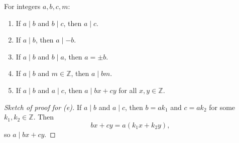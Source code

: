 \begin{proposition}
For integers $a, b, c, m$:
\begin{enumerate}[label=(\alph*)]
    \item If $a \mid b$ and $b \mid c$, then $a \mid c$.
    \item If $a \mid b$, then $a \mid -b$.
    \item If $a \mid b$ and $b \mid a$, then $a = \pm b$.
    \item If $a \mid b$ and $m \in \mathbb{Z}$, then $a \mid bm$.
    \item If $a \mid b$ and $a \mid c$, then $a \mid bx + cy$ for all $x, y \in \mathbb{Z}$.
\end{enumerate}
\end{proposition}

\begin{proof}[Sketch of proof for (e)]
If $a \mid b$ and $a \mid c$, then $b = ak_1$ and $c = ak_2$ for some $k_1, k_2 \in \mathbb{Z}$. Then
\[
bx + cy = a(k_1x + k_2y),
\]
so $a \mid bx + cy$.
\end{proof}



